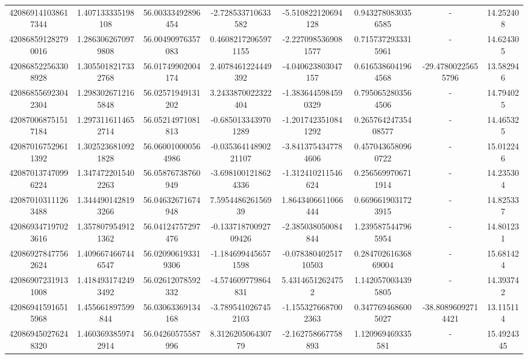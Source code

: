 \documentclass{article}
\begin{document}
\begin{landscape}
\begin{longtable}[c]{S[table-format=18.0]S[table-format=2.15]S[table-format=2.15]S[table-format=-2.17]S[table-format=-2.16]S[table-format=-2.16]S[table-format=-3.16]S[table-format=2.7]}
420869141038617344 & 1.407133335198108  & 56.00333492896454  & -2.728533710633582   & -5.510822120694128     & 0.9432780830356585  & {-}                  & 14.252408  \\
420868591282790016 & 1.2863062670979808 & 56.00490976357083  & 0.46082172065971155  & -2.2270985369081577    & 0.7157372933315961  & {-}                  & 14.624305  \\
420868522563308928 & 1.3055018217332768 & 56.01749902004174  & 2.4078461224449392   & -4.040623803047157     & 0.6165386041964568  & -29.47800225655796  & 13.582946  \\
420868556923042304 & 1.2983026712165848 & 56.02571949131202  & 3.2433870022322404   & -1.3836445984590329    & 0.7950652803564506  & {-}                  & 14.794025  \\
420870068751517184 & 1.2973116114652714 & 56.05214971081813  & -0.6850133439701289  & -1.2017423510841292    & 0.26576424735408577 & {-}                  & 14.465325  \\
420870167529611392 & 1.3025236810921828 & 56.060010000564986 & -0.03536414890221107 & -3.8413754347784606    & 0.4570436580960722  & {-}                  & 15.012246  \\
420870137470996224 & 1.3474722015402263 & 56.05876738760949  & -3.6981001218624336  & -1.312410211546624     & 0.2565699706711914  & {-}                  & 14.235304  \\
420870103111263488 & 1.3444901428193266 & 56.04632671674948  & 7.595448626156939    & 1.8643406611066444     & 0.6696619031723915  & {-}                  & 14.825337  \\
420869347197023616 & 1.3578079549121362 & 56.04124757297476  & -0.13371870092709426 & -2.385038050084844     & 1.2395875447965954  & {-}                  & 14.801231  \\
420869278477562624 & 1.4096674667446547 & 56.020906193319306 & -1.1846994456571598  & -0.07838040251710503   & 0.28470261636869004 & {-}                  & 15.681424  \\
420869072319131008 & 1.4184931742493492 & 56.02612078592332  & -4.574609779864831   & 5.43146512624752       & 1.1420570034395805  & {-}                  & 14.393742  \\
420869415916515968 & 1.455661897599844  & 56.03063369134168  & -3.7895410267452103  & -1.1553276687002363    & 0.3477694686005027  & -38.80896092714421  & 13.115114  \\
420869450276248320 & 1.4603693859742914 & 56.04260575587996  & 8.312620506430779    & -2.162758667758893     & 1.120969469335581   & {-}                  & 15.4924345 \\

\end{longtable}
\end{landscape}
\end{document}
